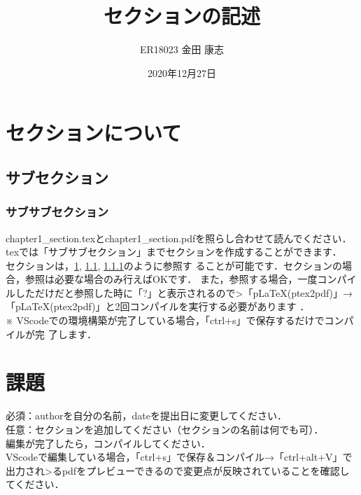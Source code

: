 \documentclass[a4paper,10pt]{jsarticle}
\title{セクションの記述}%
\author{ER18023 金田 康志}%
\date{2020年12月27日}%
\begin{document}
\maketitle%
\section{セクションについて}
\label{sec:label1}
\subsection{サブセクション}
\label{sec:label2}
\subsubsection{サブサブセクション}
\label{sec:label3}
chapter1\_section.texとchapter1\_section.pdfを照らし合わせて読んでください．\\

texでは「サブサブセクション」までセクションを作成することができます．\\
セクションは，\ref{sec:label1}, \ref{sec:label2}, \ref{sec:label3}のように参照す
ることが可能です．セクションの場合，参照は必要な場合のみ行えばOKです．
また，参照する場合，一度コンパイルしただけだと参照した時に「?」と表示されるので>「pLaTeX(ptex2pdf)」→「pLaTeX(ptex2pdf)」と2回コンパイルを実行する必要があります
．\\
※ VScodeでの環境構築が完了している場合，「ctrl+s」で保存するだけでコンパイルが完
了します．

\section{課題}
\noindent 必須：authorを自分の名前，dateを提出日に変更してください．\\
任意：セクションを追加してください（セクションの名前は何でも可）．\\

\noindent 編集が完了したら，コンパイルしてください．\\
VScodeで編集している場合，「ctrl+s」で保存＆コンパイル→「ctrl+alt+V」で出力され>るpdfをプレビューできるので変更点が反映されていることを確認してください．
\end{document}

